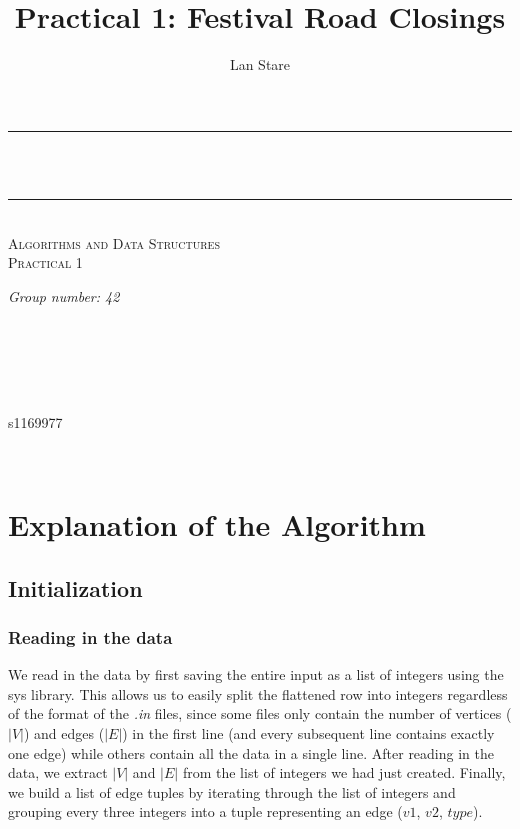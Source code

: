 \documentclass[a4paper]{article}
\title{Practical 1: Festival Road Closings}
\author{Lan Stare}
\makeatletter
\let\thetitle\@title
\let\theauthor\@author
\makeatother
\begin{document}
\begin{center}
\rule{\linewidth}{0.2 mm} \\[0.4 cm]
{ \huge \bfseries \thetitle}\\
\rule{\linewidth}{0.2 mm} \\[0.5 cm]
\textsc{\Large Algorithms and Data Structures}\\[0.2 cm]				
\textsc{\large Practical 1}\\[0.5 cm]				

\begin{minipage}{0.4\textwidth}
    \begin{flushleft} \large
        \emph{Group number: 42}\\
        \theauthor\
        \end{flushleft}
        \end{minipage}~\
        \begin{minipage}{0.4\textwidth}
        \begin{flushright} \large~\\~\\	s1169977
    \end{flushright}
\end{minipage}\\[1 cm]
\end{center}


\section{Explanation of the Algorithm}
\subsection{Initialization}
\subsubsection*{Reading in the data}
We read in the data by first saving the entire input as a list of integers using the sys library. This allows us to easily split the flattened row into integers regardless of the format of the \textsl{.in} files, since some files only contain the number of vertices ($|V|$) and edges ($|E|$) in the first line (and every subsequent line contains exactly one edge) while others contain all the data in a single line. After reading in the data, we extract $|V|$ and $|E|$ from the list of integers we had just created. Finally, we build a list of edge tuples by iterating through the list of integers and grouping every three integers into a tuple representing an edge ($v1$, $v2$, $type$).
\end{document}
